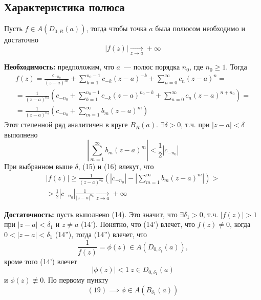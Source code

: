 \documentclass[main]{subfiles}
\begin{document}
\subsection{Характеристика полюса}
\begin{theorem}
    Пусть $f \in A(D_{0, R} (a))$, тогда чтобы точка $a$ была полюсом необходимо и достаточно
    \[|f(z)| \xrightarrow[z \to a]{} + \infty \tag{14}\]
\end{theorem}
\begin{longProof}
    \textbf{Необходимость:} предположим, что $a$~--- полюс порядка $n_0$, где $n_0 \ge 1$.
    Тогда
    \begin{multline*}
        f(z) = \frac{c_{-n_0}}{(z-a)^{n_0}} + \sum_{k=1}^{n_0 - 1} c_{-k} (z-a)^{-k} + \sum_{n=0}^{\infty} c_{n} (z-a)^n = \\
        = \frac{1}{(z-a)^{n_0}}\left( c_{-n_0} + \sum_{k=1}^{n_0 -1} c_{-k}(z-a)^{n_0 - k} + \sum_{n=0}^{\infty} c_n (z-a)^{n+n_0}\right) = \\
        = \frac{1}{(z-a)^{n_0}}\left( c_{-n_0} + \sum_{m=1}^{\infty} b_m(z-a)^{m}\right) \tag{15}
    \end{multline*}
    Этот степенной ряд аналитичен в круге $B_R(a)$.
    $\exists \delta > 0$, т.ч. при $|z-a| < \delta$ выполнено
    \[\left| \sum_{m=1}^{\infty} b_m(z-a)^{m} \right| < \frac{1}{2} \left|c_{-n_0}\right| \tag{16}\]
    При выбранном выше $\delta$, (15) и (16) влекут, что
    \begin{multline*}
        |f(z)| \ge \frac{1}{(z-a)^{n_0}} \left( \left|c_{-n_0}\right| - \left| \sum_{m=1}^{\infty} b_m(z-a)^{m} \right|\right) > \\
        > \frac{1}{2} \left|c_{-n_0}\right| \frac{1}{|z-a|^{n_0}} \xrightarrow[z \to a]{} +\infty
    \end{multline*}

    \textbf{Достаточность:} пусть выполнено (14).
    Это значит, что $\exists \delta_1 > 0$, т.ч. $|f(z)| > 1$ при $|z - a| < \delta_1$ и $z \neq a$ (14').
    Понятно, что (14') влечет, что $f(z) \neq 0$, когда $0 < |z - a| < \delta_1$ (14''), тогда (14'') влечет, что
    \[\frac{1}{f(z)} = \phi(z) \in A(D_{0, \delta_1}(a)) \tag{18},\]
    кроме того (14') влечет
    \[|\phi(z)| < 1\ z \in D_{0, \delta_1}(a) \tag{19}\]
    и $\phi(z) \not\equiv 0$.
    По первому пункту
    \[(19) \implies \phi \in A(B_{\delta_1}(a)) \tag{2}\]


\end{longProof}
\end{document}
